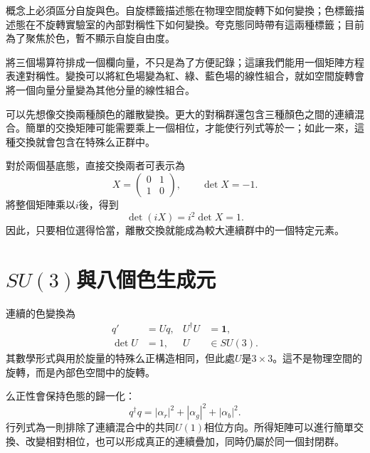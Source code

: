概念上必須區分自旋與色。自旋標籤描述態在物理空間旋轉下如何變換；色標籤描述態在不旋轉實驗室的內部對稱性下如何變換。夸克態同時帶有這兩種標籤；目前為了聚焦於色，暫不顯示自旋自由度。

將三個場算符排成一個欄向量，不只是為了方便記錄；這讓我們能用一個矩陣方程表達對稱性。變換可以將紅色場變為紅、綠、藍色場的線性組合，就如空間旋轉會將一個向量分量變為其他分量的線性組合。

可以先想像交換兩種顏色的離散變換。更大的對稱群還包含三種顏色之間的連續混合。簡單的交換矩陣可能需要乘上一個相位，才能使行列式等於一；如此一來，這種交換就會包含在特殊么正群中。

對於兩個基底態，直接交換兩者可表示為
\begin{equation}
X=
\begin{pmatrix}0&1\\1&0\end{pmatrix},
\qquad
\det X=-1.
\end{equation}
將整個矩陣乘以\(i\)後，得到
\begin{equation}
\det(iX)=i^2\det X=1.
\end{equation}
因此，只要相位選得恰當，離散交換就能成為較大連續群中的一個特定元素。

\begin{classroomqa}
\end{classroomqa}

\section{\texorpdfstring{\(SU(3)\)}{SU(3)}與八個色生成元}

連續的色變換為
\begin{equation}
\begin{aligned}
q'&=Uq,
&
U^\dagger U&=\boldsymbol 1,
\\
\det U&=1,
&
U&\in SU(3).
\end{aligned}
\label{eq:l3-su3-action}
\end{equation}
其數學形式與用於旋量的特殊么正構造相同，但此處\(U\)是\(3\times3\)。這不是物理空間的旋轉，而是內部色空間中的旋轉。

么正性會保持色態的歸一化：
\begin{equation}
q^\dagger q
=|\alpha_r|^2+|\alpha_g|^2+|\alpha_b|^2.
\end{equation}
行列式為一則排除了連續混合中的共同\(U(1)\)相位方向。所得矩陣可以進行簡單交換、改變相對相位，也可以形成真正的連續疊加，同時仍屬於同一個封閉群。

